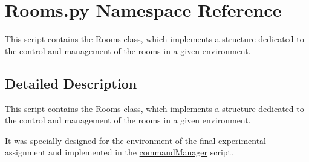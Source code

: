 \hypertarget{namespaceRooms_1_1py}{}\section{Rooms.\+py Namespace Reference}
\label{namespaceRooms_1_1py}


This script contains the \hyperlink{classRooms_1_1Rooms}{Rooms} class, which implements a structure dedicated to the control and management of the rooms in a given environment.  




\subsection{Detailed Description}
This script contains the \hyperlink{classRooms_1_1Rooms}{Rooms} class, which implements a structure dedicated to the control and management of the rooms in a given environment. 

It was specially designed for the environment of the final experimental assignment and implemented in the \hyperlink{namespacecommandManager}{command\+Manager} script. 